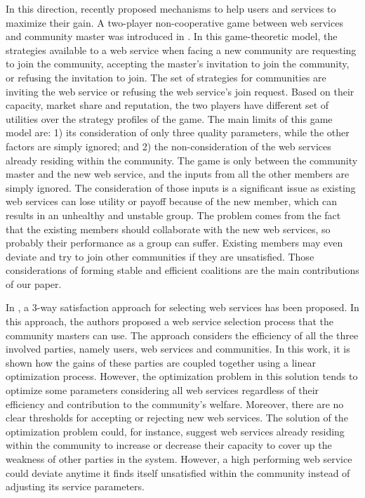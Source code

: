         In this direction, recently \cite{DBLP:conf/IEEEscc/LimTMB12,
        DBLP:conf/IEEEscc/KhosravifarABT11, 10.1109/TSC.2012.12} proposed mechanisms to help
        users and services to maximize their gain. A two-player
        non-cooperative game between web services and community master was
        introduced in \cite{DBLP:conf/IEEEscc/KhosravifarABT11}. In this
        game-theoretic model, the strategies available to a web service
        when facing a new community are requesting to join the community,
        accepting the master's invitation to join the community, or
        refusing the invitation to join. The set of strategies for
        communities are inviting the web service or refusing the web
        service's join request. Based on their capacity, market share and
        reputation, the two players have different set of utilities over
        the strategy profiles of the game. The main limits of this game
        model are: 1) its consideration of only three quality parameters,
        while the other factors are simply ignored; and 2) the
        non-consideration of the web services already residing within the
        community. The game is only between the community master and the
        new web service, and the inputs from all the other members are
        simply ignored. The consideration of those inputs is a significant
        issue as existing web services can lose utility or payoff because
        of the new member, which can results in an unhealthy and unstable
        group. The problem comes from the fact that the existing members
        should collaborate with the new web services, so probably their
        performance as a group can suffer. Existing members may even
        deviate and try to join other communities if they are unsatisfied.
        Those considerations of forming stable and efficient coalitions
        are the main contributions of our paper.

        In \cite{DBLP:conf/IEEEscc/LimTMB12}, a 3-way satisfaction approach
        for selecting web services has been proposed. In this approach,
        the authors proposed a web service selection process that the
        community masters can use. The approach considers the efficiency
        of all the three involved parties, namely users, web services and
        communities. In this work, it is shown how the gains of these
        parties are coupled together using a linear optimization process.
        However, the optimization problem in this solution tends to
        optimize some parameters considering all web services regardless
        of their efficiency and contribution to the community's welfare.
        Moreover, there are no clear thresholds for accepting or rejecting
        new web services. The solution of the optimization problem could,
        for instance, suggest web services already residing within the
        community to increase or decrease their capacity to cover up the
        weakness of other parties in the system. However, a high
        performing web service could deviate anytime it finds itself
        unsatisfied within the community instead of adjusting its service
        parameters.

